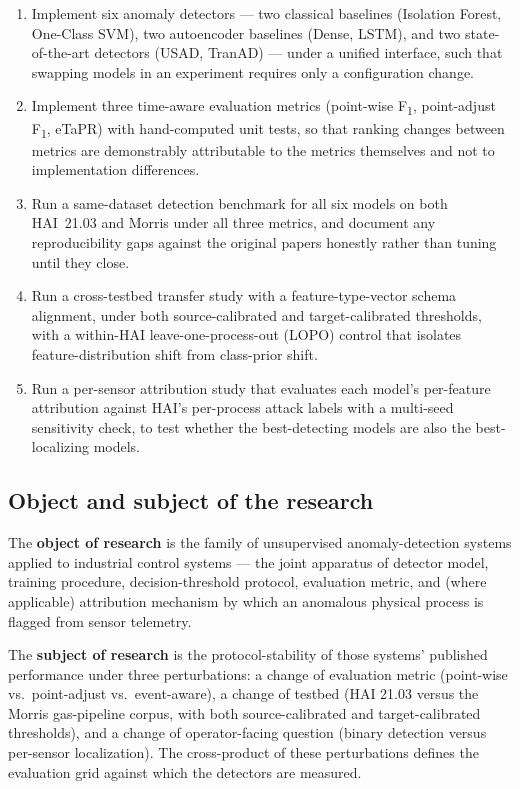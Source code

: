 \begin{enumerate}
  \item Implement six anomaly detectors --- two classical baselines (Isolation Forest, One-Class SVM), two autoencoder baselines (Dense, LSTM), and two state-of-the-art detectors (USAD, TranAD) --- under a unified  interface, such that swapping models in an experiment requires only a configuration change.
  \item Implement three time-aware evaluation metrics (point-wise F\textsubscript{1}, point-adjust F\textsubscript{1}, eTaPR) with hand-computed unit tests, so that ranking changes between metrics are demonstrably attributable to the metrics themselves and not to implementation differences.
  \item Run a same-dataset detection benchmark for all six models on both HAI~21.03 and Morris under all three metrics, and document any reproducibility gaps against the original papers honestly rather than tuning until they close.
  \item Run a cross-testbed transfer study with a feature-type-vector schema alignment, under both source-calibrated and target-calibrated thresholds, with a within-HAI leave-one-process-out (LOPO) control that isolates feature-distribution shift from class-prior shift.
  \item Run a per-sensor attribution study that evaluates each model's per-feature attribution against HAI's per-process attack labels with a multi-seed sensitivity check, to test whether the best-detecting models are also the best-localizing models.
\end{enumerate}

\subsection{Object and subject of the research}
\label{sec:object-subject}

The \textbf{object of research} is the family of unsupervised anomaly-detection systems applied to industrial control systems --- the joint apparatus of detector model, training procedure, decision-threshold protocol, evaluation metric, and (where applicable) attribution mechanism by which an anomalous physical process is flagged from sensor telemetry.

The \textbf{subject of research} is the protocol-stability of those systems' published performance under three perturbations: a change of evaluation metric (point-wise vs.\ point-adjust vs.\ event-aware), a change of testbed (HAI 21.03 versus the Morris gas-pipeline corpus, with both source-calibrated and target-calibrated thresholds), and a change of operator-facing question (binary detection versus per-sensor localization).  The cross-product of these perturbations defines the evaluation grid against which the detectors are measured.

